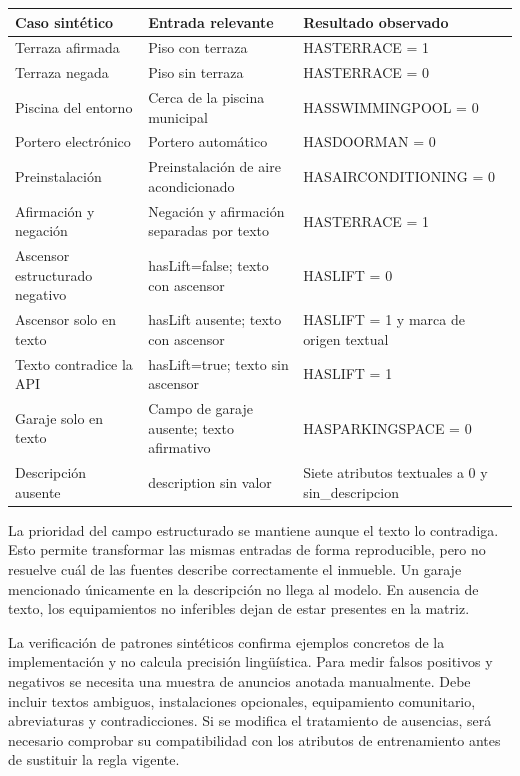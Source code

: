 \documentclass[11pt,a4paper]{article}
\newcommand{\fuente}[1]{\par\vspace{2pt}{\footnotesize\itshape #1}\par}
\newcommand{\thead}[1]{\textbf{#1}}
\begin{document}
\begin{center}
\begin{tabularx}{\linewidth}{@{}L L L@{}}
\toprule
\thead{Caso sintético} & \thead{Entrada relevante} & \thead{Resultado observado} \\
\midrule
Terraza afirmada & Piso con terraza & HASTERRACE = 1 \\
Terraza negada & Piso sin terraza & HASTERRACE = 0 \\
Piscina del entorno & Cerca de la piscina municipal & HASSWIMMINGPOOL = 0 \\
Portero electrónico & Portero automático & HASDOORMAN = 0 \\
Preinstalación & Preinstalación de aire acondicionado & HASAIRCONDITIONING = 0 \\
Afirmación y negación & Negación y afirmación separadas por texto & HASTERRACE = 1 \\
Ascensor estructurado negativo & hasLift=false; texto con ascensor & HASLIFT = 0 \\
Ascensor solo en texto & hasLift ausente; texto con ascensor & HASLIFT = 1 y marca de origen textual \\
Texto contradice la API & hasLift=true; texto sin ascensor & HASLIFT = 1 \\
Garaje solo en texto & Campo de garaje ausente; texto afirmativo & HASPARKINGSPACE = 0 \\
Descripción ausente & description sin valor & Siete atributos textuales a 0 y sin\_descripcion \\
\bottomrule
\end{tabularx}
\fuente{Fuente: elaboración propia mediante 12 casos sintéticos de extracción de atributos. La tabla agrupa los comportamientos observados; los restantes campos mantienen los valores del caso base.}
\end{center}

La prioridad del campo estructurado se mantiene aunque el texto lo contradiga. Esto permite transformar las mismas entradas de forma reproducible, pero no resuelve cuál de las fuentes describe correctamente el inmueble. Un garaje mencionado únicamente en la descripción no llega al modelo. En ausencia de texto, los equipamientos no inferibles dejan de estar presentes en la matriz.

La verificación de patrones sintéticos confirma ejemplos concretos de la implementación y no calcula precisión lingüística. Para medir falsos positivos y negativos se necesita una muestra de anuncios anotada manualmente. Debe incluir textos ambiguos, instalaciones opcionales, equipamiento comunitario, abreviaturas y contradicciones. Si se modifica el tratamiento de ausencias, será necesario comprobar su compatibilidad con los atributos de entrenamiento antes de sustituir la regla vigente.
\end{document}
